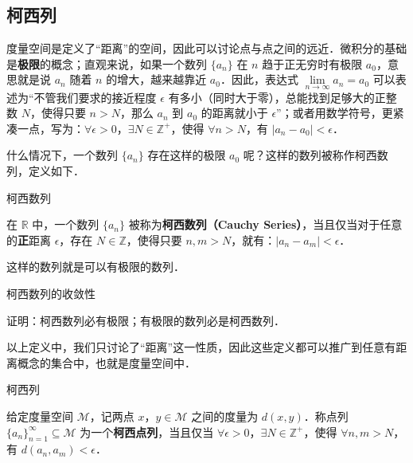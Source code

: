 
\begin{issues}
\end{issues}


\subsection{柯西列}

度量空间是定义了“距离”的空间，因此可以讨论点与点之间的远近．微积分的基础是\textbf{极限}的概念；直观来说，如果一个数列 $\{a_n\}$ 在 $n$ 趋于正无穷时有极限 $a_0$，意思就是说 $a_n$ 随着 $n$ 的增大，越来越靠近 $a_0$．因此，表达式 $\lim\limits_{n\rightarrow\infty}a_n=a_0$ 可以表述为“不管我们要求的接近程度 $\epsilon$ 有多小（同时大于零），总能找到足够大的正整数 $N$，使得只要 $n>N$，那么 $a_n$ 到 $a_0$ 的距离就小于 $\epsilon$”；或者用数学符号，更紧凑一点，写为：$\forall\epsilon>0$，$\exists N\in\mathbb{Z}^+$，使得 $\forall n>N$，有 $|a_n-a_0|<\epsilon$．

什么情况下，一个数列 $\{a_n\}$ 存在这样的极限 $a_0$ 呢？这样的数列被称作柯西数列，定义如下．

\begin{definition}{柯西数列}

在 $\mathbb{R}$ 中，一个数列 $\{a_n\}$ 被称为\textbf{柯西数列（Cauchy Series）}，当且仅当对于任意的\textbf{正}距离 $\epsilon$，存在 $N\in\mathbb{Z}$，使得只要 $n, m>N$，就有：$|a_n-a_m|<\epsilon$．

\end{definition}

这样的数列就是可以有极限的数列．

\begin{exercise}{柯西数列的收敛性}

证明：柯西数列必有极限；有极限的数列必是柯西数列．

\end{exercise}

以上定义中，我们只讨论了“距离”这一性质，因此这些定义都可以推广到任意有距离概念的集合中，也就是度量空间中．

\begin{definition}{柯西列}

给定度量空间 $\mathcal{M}$，记两点 $x$，$y\in\mathcal{M}$ 之间的度量为 $d(x, y)$．称点列 $\{a_n\}_{n=1}^{\infty}\subseteq\mathcal{M}$ 为一个\textbf{柯西点列}，当且仅当 $\forall\epsilon>0$，$\exists N\in\mathbb{Z}^+$，使得 $\forall n, m>N$，有 $d(a_n, a_m)<\epsilon$．

\end{definition}


